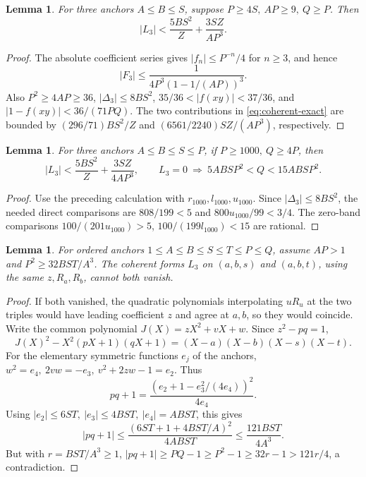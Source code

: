 \documentclass[12pt]{article}
\newtheorem{lemma}[theorem]{Lemma}
\numberwithin{equation}{section}
\begin{document}
\begin{lemma}\label{lem:general-three}
For three anchors \(A\le B\le S\), suppose \(P\ge4S,\ AP\ge9,\ Q\ge P\).
Then
\[
 |L_3|<\frac{5BS^2}{Z}+\frac{3SZ}{AP^3}.
\]
\end{lemma}
\begin{proof}
The absolute coefficient series gives \(|f_n|\le P^{-n}/4\) for \(n\ge3\),
and hence
\[
 |F_3|\le\frac1{4P^3(1-1/(AP))^3}.
\]
Also \(P^2\ge4AP\ge36\), \(|\Delta_3|\le8BS^2\),
\(35/36<|f(xy)|<37/36\), and
\(|1-f(xy)|<36/(71PQ)\). The two contributions in
\eqref{eq:coherent-exact} are bounded by
\((296/71)BS^2/Z\) and \((6561/2240)SZ/(AP^3)\), respectively.
\end{proof}

\begin{lemma}\label{lem:separated-three}
For three anchors \(A\le B\le S\le P\), if \(P\ge1000,\ Q\ge4P\), then
\[
 |L_3|<\frac{5BS^2}{Z}+\frac{3SZ}{4AP^3},\qquad
 L_3=0\ \Longrightarrow\ 5ABSP^2<Q<15ABSP^2.
\]
\end{lemma}
\begin{proof}
Use the preceding calculation with \(r_{1000},l_{1000},u_{1000}\).
Since \(|\Delta_3|\le8BS^2\), the needed direct comparisons are
\(808/199<5\) and \(800u_{1000}/99<3/4\).
The zero-band comparisons \(100/(201u_{1000})>5\),
\(100/(199l_{1000})<15\) are rational.
\end{proof}

\begin{lemma}\label{lem:four-anchor-nonvanishing}
For ordered anchors \(1\le A\le B\le S\le T\le P\le Q\), assume
\(AP>1\) and \(P^2\ge32BST/A^3\). The coherent forms \(L_3\) on
\((a,b,s)\) and \((a,b,t)\), using the same \(z,R_a,R_b\), cannot both vanish.
\end{lemma}
\begin{proof}
If both vanished, the quadratic polynomials interpolating \(uR_u\)
at the two triples would have leading coefficient \(z\) and agree at
\(a,b\), so they would coincide. Write the common polynomial
\(J(X)=zX^2+vX+w\). Since \(z^2-pq=1\),
\[
 J(X)^2-X^2(pX+1)(qX+1)=(X-a)(X-b)(X-s)(X-t).
\]
For the elementary symmetric functions \(e_j\) of the anchors,
\(w^2=e_4,\ 2vw=-e_3,\ v^2+2zw-1=e_2\). Thus
\[
 pq+1=\frac{(e_2+1-e_3^2/(4e_4))^2}{4e_4}.
\]
Using \(|e_2|\le6ST,\ |e_3|\le4BST,\ |e_4|=ABST\), this gives
\[
 |pq+1|\le\frac{(6ST+1+4BST/A)^2}{4ABST}
 \le\frac{121BST}{4A^3}.
\]
But with \(r=BST/A^3\ge1\),
\(|pq+1|\ge PQ-1\ge P^2-1\ge32r-1>121r/4\), a contradiction.
\end{proof}
\end{document}
